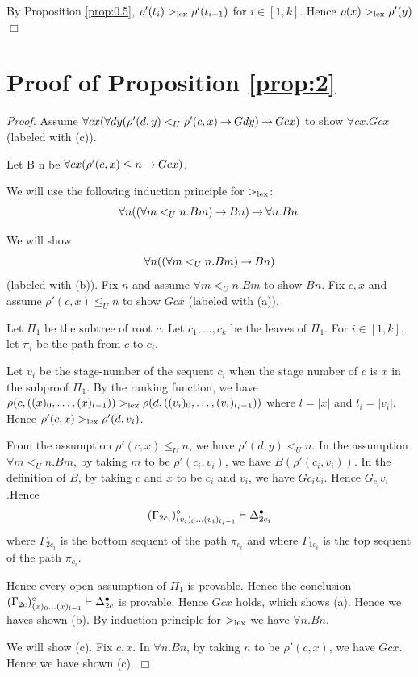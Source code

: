 By Proposition \ref{prop:0.5},
$\rho'(t_i) >_{\rm lex} \rho'(t_{i+1})$ for $i \in [1,k]$.
Hence $\rho(x) >_{\rm lex} \rho'(y)$
$\Box$

\section{Proof of Proposition \ref{prop:2}}


{\em Proof.}
Assume $\forall cx(\forall dy(\rho'(d,y) <_U \rho'(c,x) \mathbin \to Gdy) \mathbin \to Gcx)$
to show $\forall cx.Gcx$ (labeled with (c)).

Let B n be $\forall cx(\rho'(c,x) \le n \mathbin \to Gcx)$.

We will use the following induction principle for $>_{\rm lex}$:
\[
\forall n((\forall m<_U n.Bm) \mathbin \to Bn) \mathbin \to \forall n.Bn.
\]

We will show
\[
\forall n((\forall m<_U n.Bm) \mathbin \to Bn)
\]
(labeled with (b)).
Fix $n$ and 
assume $\forall m<_U n.Bm$ to show $Bn$.
Fix $c,x$ and assume $\rho'(c,x) \le_U n$ to show $Gcx$ (labeled with (a)).

Let $\Pi_1$ be the subtree of root $c$. Let $c_1,\ldots,c_k$ be the leaves
of $\Pi_1$.
For $i \in [1,k]$,
let $\pi_i$ be the path from $c$ to $c_i$.

Let $v_i$ be the stage-number of the sequent $c_i$
when the stage number of $c$ is $x$ in the subproof $\Pi_1$.
By the ranking function, we have
$\rho(c,((x)_0,\ldots,(x)_{l-1})) >_{\rm lex}
\rho(d,((v_i)_0,\ldots,(v_i)_{l_i-1}))$
where $l =|x|$ and $l_i=|v_i|$.
Hence
$\rho'(c,x) >_{\rm lex} \rho'(d,v_i)$.

From the assumption $\rho'(c,x) \le_U n$, we have
$\rho'(d,y) <_U n$.
In the assumption $\forall m<_U n.Bm$,
by taking $m$ to be $\rho'(c_i,v_i)$,
we have $B(\rho'(c_i,v_i))$.
In the definition of $B$, by taking $c$ and $x$ to be $c_i$ and $v_i$,
we have $Gc_iv_i$. Hence $G_{c_i}v_i$.Hence
\[
(\Gamma_{2c_i})^\circ_{(v_i)_0\ldots (v_i)_{l_i-1}} \mathrel \vdash \Delta_{2c_i}^\bullet
\]
where $\Gamma_{2c_i}$ is the bottom sequent of the path $\pi_{c_i}$ and
where $\Gamma_{1c_i}$ is the top sequent of the path $\pi_{c_i}$.

Hence every open assumption of $\Pi_1$ is provable.
Hence the conclusion
$(\Gamma_{2c})^\circ_{(x)_0\ldots (x)_{l-1}} \mathrel \vdash \Delta_{2c}^\bullet$
is provable.
Hence $Gcx$ holds, which shows (a).
Hence  we haves shown (b).
By induction principle for $>_{\rm lex}$ we have $\forall n.Bn$.

We will show (c).
Fix $c,x$.
In $\forall n.Bn$, by taking $n$ to be $\rho'(c,x)$, we have $Gcx$.
Hence we have shown (c).
$\Box$

